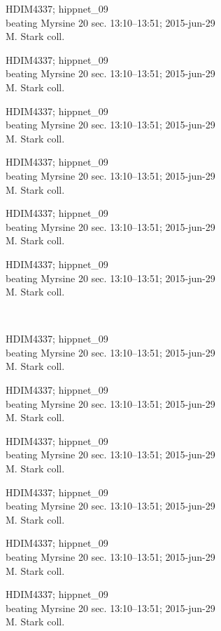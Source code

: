 \documentclass[2pt]{extarticle}
\begin{document}
\noindent
\parbox{0.16\textwidth}{\tiny \raggedright \rule[-0.3\baselineskip]{0pt}{10pt}HDIM4337; hippnet\_09\\ beating Myrsine 20 sec. 13:10--13:51; 2015-jun-29\\ M. Stark coll.}
\parbox{0.16\textwidth}{\tiny \raggedright \rule[-0.3\baselineskip]{0pt}{10pt}HDIM4337; hippnet\_09\\ beating Myrsine 20 sec. 13:10--13:51; 2015-jun-29\\ M. Stark coll.}
\parbox{0.16\textwidth}{\tiny \raggedright \rule[-0.3\baselineskip]{0pt}{10pt}HDIM4337; hippnet\_09\\ beating Myrsine 20 sec. 13:10--13:51; 2015-jun-29\\ M. Stark coll.}
\parbox{0.16\textwidth}{\tiny \raggedright \rule[-0.3\baselineskip]{0pt}{10pt}HDIM4337; hippnet\_09\\ beating Myrsine 20 sec. 13:10--13:51; 2015-jun-29\\ M. Stark coll.}
\parbox{0.16\textwidth}{\tiny \raggedright \rule[-0.3\baselineskip]{0pt}{10pt}HDIM4337; hippnet\_09\\ beating Myrsine 20 sec. 13:10--13:51; 2015-jun-29\\ M. Stark coll.}
\parbox{0.16\textwidth}{\tiny \raggedright \rule[-0.3\baselineskip]{0pt}{10pt}HDIM4337; hippnet\_09\\ beating Myrsine 20 sec. 13:10--13:51; 2015-jun-29\\ M. Stark coll.} \\ 
\vspace{0.001in} 

\noindent
\parbox{0.16\textwidth}{\tiny \raggedright \rule[-0.3\baselineskip]{0pt}{10pt}HDIM4337; hippnet\_09\\ beating Myrsine 20 sec. 13:10--13:51; 2015-jun-29\\ M. Stark coll.}
\parbox{0.16\textwidth}{\tiny \raggedright \rule[-0.3\baselineskip]{0pt}{10pt}HDIM4337; hippnet\_09\\ beating Myrsine 20 sec. 13:10--13:51; 2015-jun-29\\ M. Stark coll.}
\parbox{0.16\textwidth}{\tiny \raggedright \rule[-0.3\baselineskip]{0pt}{10pt}HDIM4337; hippnet\_09\\ beating Myrsine 20 sec. 13:10--13:51; 2015-jun-29\\ M. Stark coll.}
\parbox{0.16\textwidth}{\tiny \raggedright \rule[-0.3\baselineskip]{0pt}{10pt}HDIM4337; hippnet\_09\\ beating Myrsine 20 sec. 13:10--13:51; 2015-jun-29\\ M. Stark coll.}
\parbox{0.16\textwidth}{\tiny \raggedright \rule[-0.3\baselineskip]{0pt}{10pt}HDIM4337; hippnet\_09\\ beating Myrsine 20 sec. 13:10--13:51; 2015-jun-29\\ M. Stark coll.}
\parbox{0.16\textwidth}{\tiny \raggedright \rule[-0.3\baselineskip]{0pt}{10pt}HDIM4337; hippnet\_09\\ beating Myrsine 20 sec. 13:10--13:51; 2015-jun-29\\ M. Stark coll.} \\ 
\vspace{0.001in} 
\end{document}
